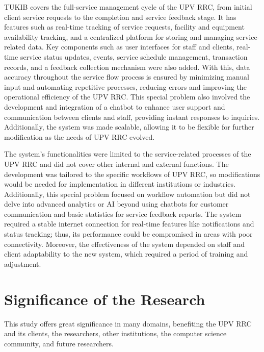 TUKIB covers the full-service management cycle of the UPV RRC, from initial client service requests to the completion and service feedback stage. It has features such as real-time tracking of service requests, facility and equipment availability tracking, and a centralized platform for storing and managing service-related data. Key components such as user interfaces for staff and clients, real-time service status updates, events, service schedule management, transaction records, and a feedback collection mechanism were also added. With this, data accuracy throughout the service flow process is ensured by minimizing manual input and automating repetitive processes, reducing errors and improving the operational efficiency of the UPV RRC. This special problem also involved the development and integration of a chatbot to enhance user support and communication between clients and staff, providing instant responses to inquiries. Additionally, the system was made scalable, allowing it to be flexible for further modification as the needs of UPV RRC evolved.

The system’s functionalities were limited to the service-related processes of the UPV RRC and did not cover other internal and external functions. The development was tailored to the specific workflows of UPV RRC, so modifications would be needed for implementation in different institutions or industries. Additionally, this special problem focused on workflow automation but did not delve into advanced analytics or AI beyond using chatbots for customer communication and basic statistics for service feedback reports. The system required a stable internet connection for real-time features like notifications and status tracking; thus, its performance could be compromised in areas with poor connectivity. Moreover, the effectiveness of the system depended on staff and client adaptability to the new system, which required a period of training and adjustment.


\section{Significance of the Research}
\label{sec:significance}

This study offers great significance in many domains, benefiting the UPV RRC and its clients, the researchers, other institutions, the computer science community, and future researchers.

